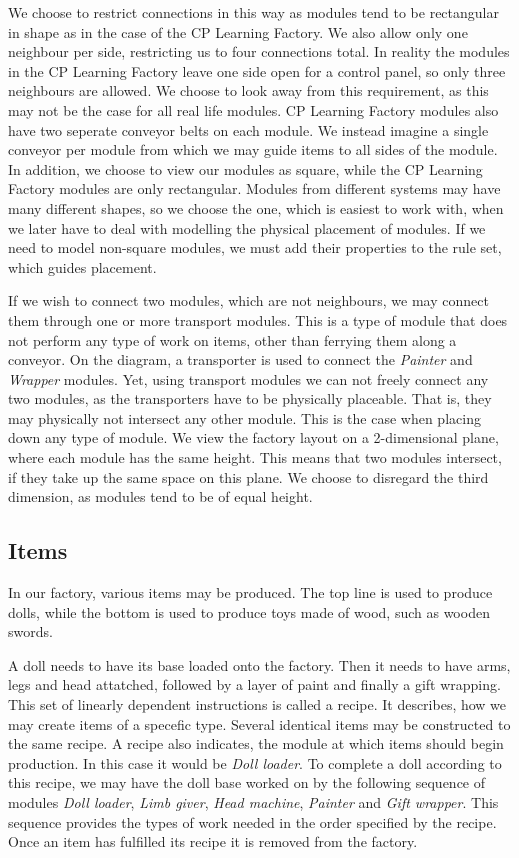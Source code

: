 We choose to restrict connections in this way as modules tend to be rectangular in shape as in the case of the CP Learning Factory. We also allow only one neighbour per side, restricting us to four connections total. In reality the modules in the CP Learning Factory leave one side open for a control panel, so only three neighbours are allowed. We choose to look away from this requirement, as this may not be the case for all real life modules. CP Learning Factory modules also have two seperate conveyor belts on each module. We instead imagine a single conveyor per module from which we may guide items to all sides of the module. In addition, we choose to view our modules as square, while the CP Learning Factory modules are only rectangular. Modules from different systems may have many different shapes, so we choose the one, which is easiest to work with, when we later have to deal with modelling the physical placement of modules. If we need to model non-square modules, we must add their properties to the rule set, which guides placement. 

If we wish to connect two modules, which are not neighbours, we may connect them through one or more transport modules. This is a type of module that does not perform any type of work on items, other than ferrying them along a conveyor. On the diagram, a transporter is used to connect the \textit{Painter} and \textit{Wrapper} modules. Yet, using transport modules we can not freely connect any two modules, as the transporters have to be physically placeable. That is, they may physically not intersect any other module. This is the case when placing down any type of module. We view the factory layout on a 2-dimensional plane, where each module has the same height. This means that two modules intersect, if they take up the same space on this plane. We choose to disregard the third dimension, as modules tend to be of equal height.  

\subsection{Items}
In our factory, various items may be produced. The top line is used to produce dolls, while the bottom is used to produce toys made of wood, such as wooden swords. 

A doll needs to have its base loaded onto the factory. Then it needs to have arms, legs and head attatched, followed by a layer of paint and finally a gift wrapping. This set of linearly dependent instructions is called a recipe. It describes, how we may create items of a specefic type. Several identical items may be constructed to the same recipe. A recipe also indicates, the module at which items should begin production. In this case it would be \textit{Doll loader}. To complete a doll according to this recipe, we may have the doll base worked on by the following sequence of modules \textit{Doll loader}, \textit{Limb giver}, \textit{Head machine}, \textit{Painter} and \textit{Gift wrapper}. This sequence provides the types of work needed in the order specified by the recipe. Once an item has fulfilled its recipe it is removed from the factory. 

